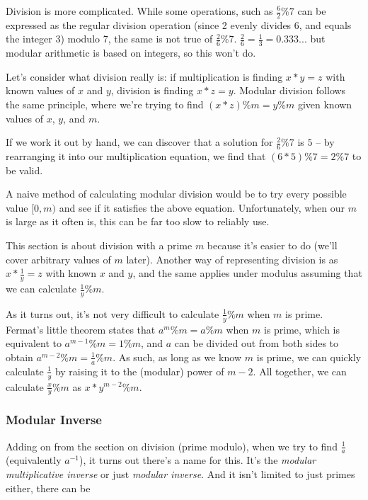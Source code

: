Division is more complicated. While some operations, such as $\frac{6}{2} \% 7$ can be expressed as the regular division operation (since 2 evenly divides 6, and equals the integer 3) modulo 7, the same is not true of $\frac{2}{6} \% 7$. $\frac{2}{6} = \frac{1}{3} = 0.333...$ but modular arithmetic is based on integers, so this won't do.

Let's consider what division really is: if multiplication is finding $x * y = z$ with known values of $x$ and $y$, division is finding $x * z = y$. Modular division follows the same principle, where we're trying to find $(x * z) \% m = y \% m$ given known values of $x$, $y$, and $m$.

If we work it out by hand, we can discover that a solution for $\frac{2}{6} \% 7$ is $5$ -- by rearranging it into our multiplication equation, we find that $(6 * 5) \% 7 = 2 \% 7$ to be valid.

A naive method of calculating modular division would be to try every possible value $[0, m)$ and see if it satisfies the above equation. Unfortunately, when our $m$ is large as it often is, this can be far too slow to reliably use.

This section is about division with a prime $m$ because it's easier to do (we'll cover arbitrary values of $m$ later). Another way of representing division is as $x * \frac{1}{y} = z$ with known $x$ and $y$, and the same applies under modulus assuming that we can calculate $\frac{1}{y} \% m$.

As it turns out, it's not very difficult to calculate $\frac{1}{y} \% m$ when $m$ is prime. Fermat's little theorem states that $a^m \% m = a \% m$ when $m$ is prime, which is equivalent to $a^{m-1} \% m = 1 \% m$, and $a$ can be divided out from both sides to obtain $a^{m-2} \% m = \frac{1}{a} \% m$. As such, as long as we know $m$ is prime, we can quickly calculate $\frac{1}{y}$ by raising it to the (modular) power of $m-2$. All together, we can calculate $\frac{x}{y} \% m$ as $x * y^{m-2} \% m$.

\subsubsection{Modular Inverse}

Adding on from the section on division (prime modulo), when we try to find $\frac{1}{a}$ (equivalently $a^{-1}$), it turns out there's a name for this. It's the \textit{modular multiplicative inverse} or just \textit{modular inverse}. And it isn't limited to just primes either, there can be 

